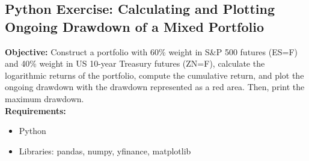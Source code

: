 \documentclass{article}
\begin{document}
\subsection{Python Exercise: Calculating and Plotting Ongoing Drawdown of a Mixed Portfolio}

\textbf{Objective:} Construct a portfolio with 60\% weight in S\&P 500 futures (ES=F) and 40\% weight in US 10-year Treasury futures (ZN=F), calculate the logarithmic returns of the portfolio, compute the cumulative return, and plot the ongoing drawdown with the drawdown represented as a red area. Then, print the maximum drawdown. \\

\textbf{Requirements:}
\begin{itemize}
    \item Python
    \item Libraries: pandas, numpy, yfinance, matplotlib
\end{itemize}
\end{document}
